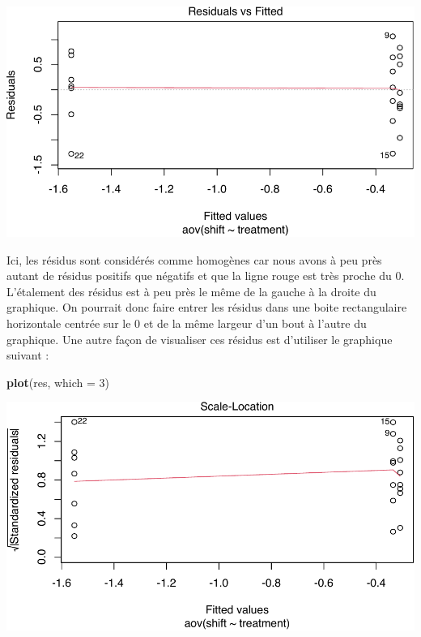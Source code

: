 \documentclass[
  a4paper,
]{article}
\newenvironment{Shaded}{\begin{snugshade}}{\end{snugshade}}
\newcommand{\DataTypeTok}[1]{\textcolor[rgb]{0.00,0.34,0.68}{#1}}
\newcommand{\DecValTok}[1]{\textcolor[rgb]{0.69,0.50,0.00}{#1}}
\newcommand{\KeywordTok}[1]{\textcolor[rgb]{0.12,0.11,0.11}{\textbf{#1}}}
\newcommand{\NormalTok}[1]{\textcolor[rgb]{0.12,0.11,0.11}{#1}}
\begin{document}
\begin{center}\includegraphics[width=0.9\linewidth]{figure/unnamed-chunk-80-1} \end{center}

Ici, les résidus sont considérés comme homogènes car nous avons à peu près autant de résidus positifs que négatifs et que la ligne rouge est très proche du 0. L'étalement des résidus est à peu près le même de la gauche à la droite du graphique. On pourrait donc faire entrer les résidus dans une boite rectangulaire horizontale centrée sur le 0 et de la même largeur d'un bout à l'autre du graphique. Une autre façon de visualiser ces résidus est d'utiliser le graphique suivant :

\begin{Shaded}
\begin{Highlighting}[]
\KeywordTok{plot}\NormalTok{(res, }\DataTypeTok{which =} \DecValTok{3}\NormalTok{)}
\end{Highlighting}
\end{Shaded}

\begin{center}\includegraphics[width=0.9\linewidth]{figure/unnamed-chunk-81-1} \end{center}
\end{document}
